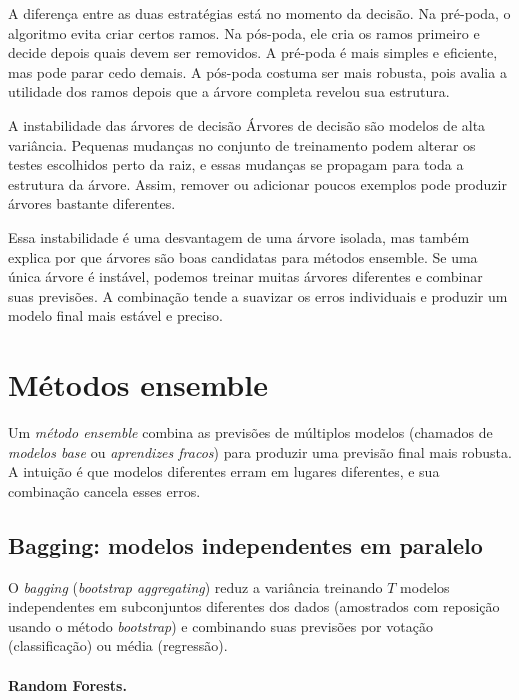 \documentclass[12pt,a4paper]{article}
\begin{document}
A diferença entre as duas estratégias está no momento da decisão. Na pré-poda, o algoritmo evita criar certos ramos. Na pós-poda, ele cria os ramos primeiro e decide depois quais devem ser removidos. A pré-poda é mais simples e eficiente, mas pode parar cedo demais. A pós-poda costuma ser mais robusta, pois avalia a utilidade dos ramos depois que a árvore completa revelou sua estrutura.

\begin{alertabox}{A instabilidade das árvores de decisão}
Árvores de decisão são modelos de alta variância. Pequenas mudanças no conjunto de treinamento podem alterar os testes escolhidos perto da raiz, e essas mudanças se propagam para toda a estrutura da árvore. Assim, remover ou adicionar poucos exemplos pode produzir árvores bastante diferentes.

Essa instabilidade é uma desvantagem de uma árvore isolada, mas também explica por que árvores são boas candidatas para métodos ensemble. Se uma única árvore é instável, podemos treinar muitas árvores diferentes e combinar suas previsões. A combinação tende a suavizar os erros individuais e produzir um modelo final mais estável e preciso.
\end{alertabox}

\section{Métodos ensemble}
\label{subsec:ensemble}

Um \emph{método ensemble} combina as previsões de múltiplos modelos (chamados de \emph{modelos base} ou \emph{aprendizes fracos}) para produzir uma previsão final mais robusta. A intuição é que modelos diferentes erram em lugares diferentes, e sua combinação cancela esses erros.

\subsection{Bagging: modelos independentes em paralelo}

O \emph{bagging} (\textit{bootstrap aggregating}) reduz a variância treinando $T$ modelos independentes em subconjuntos diferentes dos dados (amostrados com reposição usando o método \textit{bootstrap}) e combinando suas previsões por votação (classificação) ou média (regressão).

\paragraph{Random Forests.}
\end{document}
